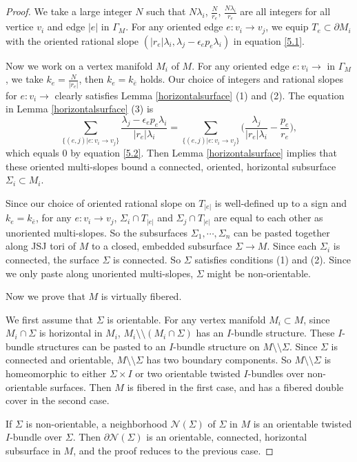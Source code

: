\documentclass{amsart}
\numberwithin{equation}{section}
\theoremstyle{definition}
\begin{document}
\begin{proof}

We take a large integer $N$ such that $N\lambda_i$, $\frac{N}{r_e}$, $\frac{N\lambda_i}{r_e}$ are all integers for all vertice $v_i$ and edge $|e|$ in $\Gamma_M$. For any oriented edge $e:v_i\to v_j$, we equip $T_e\subset \partial M_i$ with the oriented rational slope $(|r_e|\lambda_i, \lambda_j-\epsilon_ep_e \lambda_i)$ in equation \eqref{5.1}. 

Now we work on a vertex manifold $M_i$ of $M$. For any oriented edge $e:v_i\to $ in $\Gamma_M$, we take $k_e=\frac{N}{|r_e|}$, then $k_e=k_{\bar{e}}$ holds. Our choice of integers and rational slopes for $e:v_i\to$ clearly satisfies Lemma \ref{horizontalsurface} (1) and (2). The equation in Lemma \ref{horizontalsurface} (3) is 
$$\sum_{\{(e,j)|e:v_i\to v_j\}}\frac{\lambda_j-\epsilon_ep_e \lambda_i}{|r_e|\lambda_i}=\sum_{\{(e,j)|e:v_i\to v_j\}}\Big(\frac{\lambda_j}{|r_e|\lambda_i}-\frac{p_e}{r_e}\Big),$$
which equals $0$ by equation \eqref{5.2}. Then Lemma \ref{horizontalsurface} implies that these oriented multi-slopes bound a connected, oriented, horizontal subsurface $\Sigma_i\subset M_i$.

Since our choice of oriented rational slope on $T_{|e|}$ is well-defined up to a sign and $k_e=k_{\bar{e}}$, for any $e:v_i\to v_j$, $\Sigma_i \cap T_{|e|}$ and $\Sigma_j\cap T_{|e|}$ are equal to each other as unoriented multi-slopes. So the subsurfaces $\Sigma_1,\cdots,\Sigma_n$ can be pasted together along JSJ tori of $M$ to a closed, embedded subsurface $\Sigma\to M$. Since each $\Sigma_i$ is connected, the surface $\Sigma$ is connected. So $\Sigma$ satisfies conditions (1) and (2).
Since we only paste along unoriented multi-slopes, $\Sigma$ might be non-orientable. 

Now we prove that $M$ is virtually fibered.

We first assume that $\Sigma$ is orientable. For any vertex manifold $M_i\subset M$, since $M_i\cap \Sigma$ is horizontal in $M_i$, $M_i\setminus\setminus (M_i\cap \Sigma)$ has an $I$-bundle structure. These $I$-bundle structures can be pasted to an $I$-bundle structure on $M\setminus\setminus \Sigma$. Since $\Sigma$ is connected and orientable, $M\setminus \setminus \Sigma$ has two boundary components. So $M\setminus\setminus \Sigma$ is homeomorphic to either $\Sigma\times I$ or two orientable twisted $I$-bundles over non-orientable surfaces. Then $M$ is fibered in the first case, and has a fibered double cover in the second case.

If $\Sigma$ is non-orientable, a neighborhood $\mathcal{N}(\Sigma)$ of $\Sigma$ in $M$ is an orientable twisted $I$-bundle over $\Sigma$. Then $\partial \mathcal{N}(\Sigma)$ is an orientable, connected, horizontal subsurface in $M$, and the proof reduces to the previous case.
\end{proof}
\end{document}
